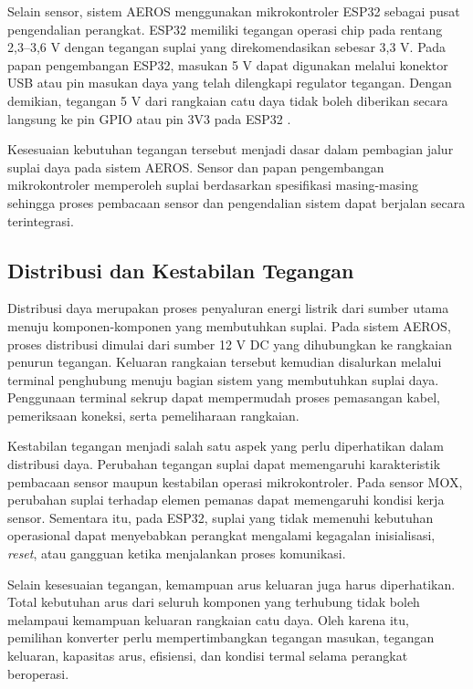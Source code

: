 Selain sensor, sistem AEROS menggunakan mikrokontroler ESP32 sebagai pusat pengendalian perangkat. ESP32 memiliki tegangan operasi chip pada rentang 2,3--3,6 V dengan tegangan suplai yang direkomendasikan sebesar 3,3 V. Pada papan pengembangan ESP32, masukan 5 V dapat digunakan melalui konektor USB atau pin masukan daya yang telah dilengkapi regulator tegangan. Dengan demikian, tegangan 5 V dari rangkaian catu daya tidak boleh diberikan secara langsung ke pin GPIO atau pin 3V3 pada ESP32 \cite{espressif_esp32}.

Kesesuaian kebutuhan tegangan tersebut menjadi dasar dalam pembagian jalur suplai daya pada sistem AEROS. Sensor dan papan pengembangan mikrokontroler memperoleh suplai berdasarkan spesifikasi masing-masing sehingga proses pembacaan sensor dan pengendalian sistem dapat berjalan secara terintegrasi.

\subsection{Distribusi dan Kestabilan Tegangan}
\label{subsec:Distribusi_Kestabilan_Tegangan}

Distribusi daya merupakan proses penyaluran energi listrik dari sumber utama menuju komponen-komponen yang membutuhkan suplai. Pada sistem AEROS, proses distribusi dimulai dari sumber 12 V DC yang dihubungkan ke rangkaian penurun tegangan. Keluaran rangkaian tersebut kemudian disalurkan melalui terminal penghubung menuju bagian sistem yang membutuhkan suplai daya. Penggunaan terminal sekrup dapat mempermudah proses pemasangan kabel, pemeriksaan koneksi, serta pemeliharaan rangkaian.

Kestabilan tegangan menjadi salah satu aspek yang perlu diperhatikan dalam distribusi daya. Perubahan tegangan suplai dapat memengaruhi karakteristik pembacaan sensor maupun kestabilan operasi mikrokontroler. Pada sensor MOX, perubahan suplai terhadap elemen pemanas dapat memengaruhi kondisi kerja sensor. Sementara itu, pada ESP32, suplai yang tidak memenuhi kebutuhan operasional dapat menyebabkan perangkat mengalami kegagalan inisialisasi, \textit{reset}, atau gangguan ketika menjalankan proses komunikasi.

Selain kesesuaian tegangan, kemampuan arus keluaran juga harus diperhatikan. Total kebutuhan arus dari seluruh komponen yang terhubung tidak boleh melampaui kemampuan keluaran rangkaian catu daya. Oleh karena itu, pemilihan konverter perlu mempertimbangkan tegangan masukan, tegangan keluaran, kapasitas arus, efisiensi, dan kondisi termal selama perangkat beroperasi.

